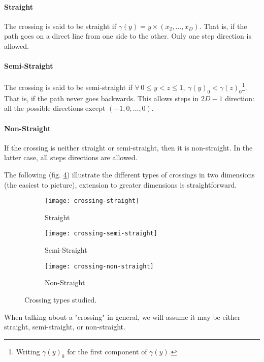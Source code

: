 \paragraph{Straight}
The crossing is said to be straight if $\gamma(y) = y \times (x_2,\dots,x_D)$.
That is, if the path goes on a direct line from one side to the other.
Only one step direction is allowed.

\paragraph{Semi-Straight}
The crossing is said to be semi-straight if $\forall \, 0 \leq y < z \leq 1, \ \gamma(y)_0 < \gamma(z)_0$\footnote{Writing $\gamma(y)_0$ for the first component of $\gamma(y)$.}.
That is, if the path never goes backwards.
This allows steps in $2D-1$ direction: all the possible directions except $(-1,0,\dots,0)$.

\paragraph{Non-Straight}
If the crossing is neither straight or semi-straight, then it is non-straight.
In the latter case, all steps directions are allowed.

The following (fig. \ref{fig:crossingTypes}) illustrate the different types of crossings in two dimensions (the easiest to picture), extension to greater dimensions is straightforward.
\begin{figure}[!h]
	\begin{subfigure}{0.3\linewidth}
		\texttt{[image: crossing-straight]}
		\centering
		\captionsetup{justification=centering}
		\caption{Straight}
		\label{fig:crossingStraight}
	\end{subfigure}
	\hspace{0.04\linewidth}
	\begin{subfigure}{0.3\linewidth}
		\texttt{[image: crossing-semi-straight]}
		\centering
		\captionsetup{justification=centering}
		\caption{Semi-Straight}
		\label{fig:crossingSemiStraight}
	\end{subfigure}
	\hspace{0.04\linewidth}
	\begin{subfigure}{0.3\linewidth}
		\texttt{[image: crossing-non-straight]}
		\centering
		\captionsetup{justification=centering}
		\caption{Non-Straight}
		\label{fig:crossingNonStraight}
	\end{subfigure}
	\caption{Crossing types studied.}
	\label{fig:crossingTypes}
\end{figure}
When talking about a "crossing" in general, we will assume it may be either straight, semi-straight, or non-straight.


